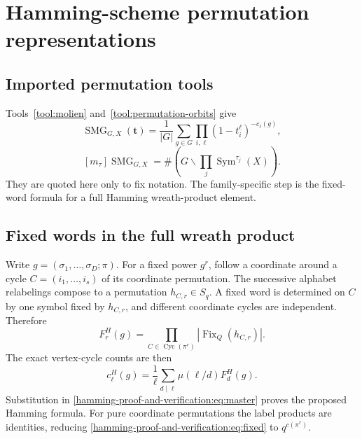 \documentclass[10pt]{article}
\newcommand{\Sym}{\operatorname{Sym}}
\newcommand{\SMG}{\operatorname{SMG}}
\begin{document}
\clearpage
\section{Hamming-scheme permutation representations}\label{proof:hamming}
\begingroup
\providecommand{\Sym}{\operatorname{Sym}}
\renewcommand{\Sym}{\operatorname{Sym}}
\providecommand{\cS}{\SMG}
\renewcommand{\cS}{\SMG}
\setcounter{theorem}{0}
\setcounter{proposition}{0}
\setcounter{lemma}{0}
\setcounter{corollary}{0}
\setcounter{remark}{0}
\begin{abstract}
We prove and test the generalized Molien formula for the full Hamming graph
automorphism group $S_q\wr S_D=S_q^D\rtimes S_D$ acting on $Q^D$.  The tests
construct every wreath-product element, not merely pure coordinate
permutations, and compare matrix, cycle, and orbit calculations through total
degree three.
\end{abstract}

\subsection{Imported permutation tools}
Tools~\ref{tool:molien} and~\ref{tool:permutation-orbits} give
\begin{equation}\label{hamming-proof-and-verification:eq:master}
\cS_{G,X}(\mathbf t)=\frac1{|G|}\sum_{g\in G}
\prod_{i,\ell}(1-t_i^\ell)^{-c_\ell(g)},
\end{equation}
\begin{equation}\label{hamming-proof-and-verification:eq:orbit}
[m_\tau]\cS_{G,X}=\#\!\left(G\backslash
\prod_j\Sym^{\tau_j}(X)\right).
\end{equation}
They are quoted here only to fix notation. The family-specific step is the
fixed-word formula for a full Hamming wreath-product element.

\subsection{Fixed words in the full wreath product}
Write $g=(\sigma_1,\ldots,\sigma_D;\pi)$.  For a fixed power $g^r$, follow a
coordinate around a cycle $C=(i_1,\ldots,i_s)$ of its coordinate permutation.
The successive alphabet relabelings compose to a permutation $h_{C,r}\in S_q$.
A fixed word is determined on $C$ by one symbol fixed by $h_{C,r}$, and
different coordinate cycles are independent.  Therefore
\begin{equation}\label{hamming-proof-and-verification:eq:fixed}
F_r^H(g)=\prod_{C\in\operatorname{Cyc}(\pi^r)}
|\operatorname{Fix}_Q(h_{C,r})|.
\end{equation}
The exact vertex-cycle counts are then
\begin{equation}\label{hamming-proof-and-verification:eq:mobius}
c_\ell^H(g)=\frac1\ell\sum_{d\mid\ell}\mu(\ell/d)F_d^H(g).
\end{equation}
Substitution in \eqref{hamming-proof-and-verification:eq:master} proves the proposed Hamming formula.  For
pure coordinate permutations the label products are identities, reducing
\eqref{hamming-proof-and-verification:eq:fixed} to $q^{c(\pi^r)}$.
\end{document}

